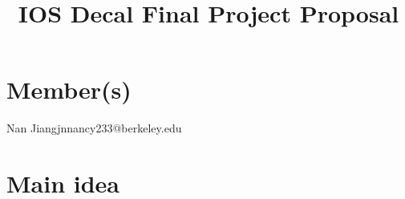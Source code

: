 \documentclass[11pt]{article}
\title{IOS Decal Final Project Proposal}
\date{}
\makeatletter
\def\Name{Nan Jiang}  %
\def\email{jnnancy233@berkeley.edu}  %
\makeatother
\begin{document}
\bfseries\maketitle
\section*{Member(s)}
\Name{\hspace*{1cm}}\email

\section*{Main idea}
\end{document}
